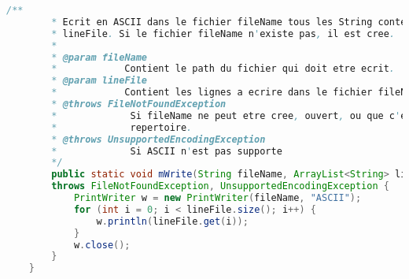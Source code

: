 \documentclass[a4paper]{article}
\begin{document}
\begin{enumerate}
\begin{lstlisting}[language=Java]
		/**
		* Ecrit en ASCII dans le fichier fileName tous les String contenu dans
		* lineFile. Si le fichier fileName n'existe pas, il est cree.
		* 
		* @param fileName
		*            Contient le path du fichier qui doit etre ecrit.
		* @param lineFile
		*            Contient les lignes a ecrire dans le fichier fileName.
		* @throws FileNotFoundException
		*             Si fileName ne peut etre cree, ouvert, ou que c'est un
		*             repertoire.
		* @throws UnsupportedEncodingException
		*             Si ASCII n'est pas supporte
		*/
		public static void mWrite(String fileName, ArrayList<String> lineFile)
		throws FileNotFoundException, UnsupportedEncodingException {
			PrintWriter w = new PrintWriter(fileName, "ASCII");
			for (int i = 0; i < lineFile.size(); i++) {
				w.println(lineFile.get(i));
			}
			w.close();
		}
	}	
\end{lstlisting}
\end{enumerate}
\end{document}
